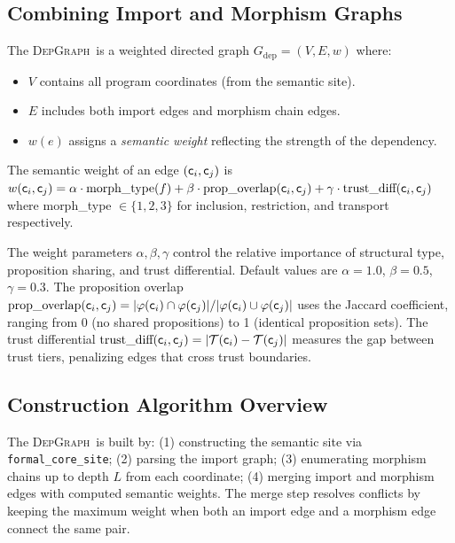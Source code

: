 \documentclass[11pt]{article}
\newcommand{\DepGraph}{\textsc{DepGraph}}
\newcommand{\FormalSite}{\texttt{formal\_core\_site}}
\begin{document}
\subsection{Combining Import and Morphism Graphs}
The \DepGraph\ is a weighted directed graph $G_{\mathrm{dep}} = (V, E, w)$
where:
\begin{itemize}[noitemsep]
  \item $V$ contains all program coordinates (from the semantic site).
  \item $E$ includes both import edges and morphism chain edges.
  \item $w(e)$ assigns a \emph{semantic weight} reflecting the strength
        of the dependency.
\end{itemize}

\begin{definition}\label{def:sem-weight}
The semantic weight of an edge $(\mathsf{c}_i, \mathsf{c}_j)$ is
$w(\mathsf{c}_i, \mathsf{c}_j) = \alpha \cdot \text{morph\_type}(f) + \beta \cdot
\text{prop\_overlap}(\mathsf{c}_i, \mathsf{c}_j) + \gamma \cdot
\text{trust\_diff}(\mathsf{c}_i, \mathsf{c}_j)$ where morph\_type $\in \{1,2,3\}$
for inclusion, restriction, and transport respectively.
\end{definition}

The weight parameters $\alpha, \beta, \gamma$ control the relative
importance of structural type, proposition sharing, and trust differential.
Default values are $\alpha = 1.0$, $\beta = 0.5$, $\gamma = 0.3$.  The
proposition overlap $\text{prop\_overlap}(\mathsf{c}_i, \mathsf{c}_j) =
|\varphi(\mathsf{c}_i) \cap \varphi(\mathsf{c}_j)| / |\varphi(\mathsf{c}_i) \cup
\varphi(\mathsf{c}_j)|$ uses the Jaccard coefficient, ranging from 0 (no shared
propositions) to 1 (identical proposition sets).  The trust differential
$\text{trust\_diff}(\mathsf{c}_i, \mathsf{c}_j) = |\mathcal{T}(\mathsf{c}_i) -
\mathcal{T}(\mathsf{c}_j)|$ measures the gap between trust tiers, penalizing edges
that cross trust boundaries.

\subsection{Construction Algorithm Overview}
The \DepGraph\ is built by: (1) constructing the semantic site via
\FormalSite; (2) parsing the import graph; (3) enumerating morphism chains
up to depth $L$ from each coordinate; (4) merging import and morphism edges
with computed semantic weights.  The merge step resolves conflicts by
keeping the maximum weight when both an import edge and a morphism edge
connect the same pair.
\end{document}
